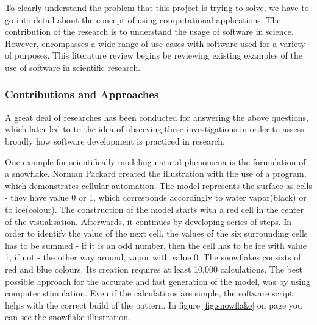 
To clearly understand the problem that this project is trying to solve, we have to go into detail about the concept of using computational applications. The contribution of the research is to understand the usage of software in science. However, encompasses a wide range of use cases with software used for a variety of purposes. This literature review begins be reviewing existing examples of the use of software in scientific research.

\subsubsection{Contributions and Approaches}
\label{sec:contributions}

A great deal of researches has been conducted for answering the above questions, which later led to to the idea of observing these investigations in order to assess broadly how software development is practiced in research.

One example for scientifically modeling natural phenomena is the formulation of a snowflake. Norman Packard created the illustration with the use of a program, which demonstrates cellular automation.\cite{wolfram1984computer}\cite{packard1986lattice} The model represents the surface as cells - they have value 0 or 1, which corresponds accordingly to water vapor(black) or to ice(colour). The construction of the model starts with a red cell in the center of the visualisation. Afterwards, it continues by developing series of steps. In order to identify the value of the next cell, the values of the six surrounding cells has to be summed - if it is an odd number, then the cell has to be ice with value 1, if not - the other way around, vapor with value 0. The snowflakes consists of red and blue colours. Its creation requires at least 10,000 calculations. The best possible approach for the accurate and fast generation of the model, was by using computer stimulation. Even if the calculations are simple, the software script helps with the correct build of the pattern.\cite{wolfram1984computer} In figure \ref{fig:snowflake} on page \pageref{fig:snowflake} you can see the snowflake illustration.

